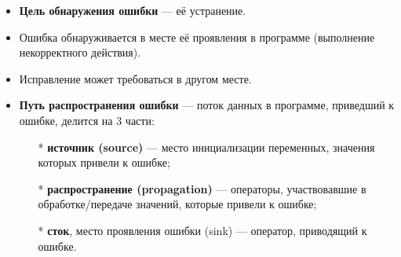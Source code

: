 \begin{itemize}
    \item \textbf{Цель обнаружения ошибки} — её устранение.
    \item Ошибка обнаруживается в месте её проявления в программе (выполнение некорректного действия).
    \item Исправление может требоваться в другом месте.
    \item \textbf{Путь распространения ошибки} — поток данных в программе, приведший к ошибке, делится на 3 части:
    \begin{itemize}
        \item[*] \textbf{источник (source)} — место инициализации переменных, значения которых привели к ошибке;
        \item[*] \textbf{распространение (propagation)} — операторы, участвовавшие в обработке/передаче значений, которые привели к ошибке;
        \item[*] \textbf{сток}, место проявления ошибки (sink) — оператор, приводящий к ошибке.
    \end{itemize}
\end{itemize}